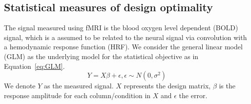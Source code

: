 \documentclass[article]{jss}
\begin{document}
\subsection{Statistical measures of design optimality}

The signal measured using fMRI is the blood oxygen level dependent
(BOLD) signal, which is a assumed to be related to the neural signal
via convolution with a hemodynamic response function (HRF).  We
consider the general linear model (GLM) as the underlying model for
the statistical objective as in Equation~\ref{eq:GLM}.
%
\begin{equation} \label{eq:GLM}
Y = X\beta + \epsilon, \epsilon \sim N(0,\sigma^2)
\end{equation}
%
We denote  $Y$  as the measured signal.  $X$ represents the design matrix,  $\beta$  is the response amplitude for each column/condition in $X$ and $\epsilon$ the error.
\end{document}

